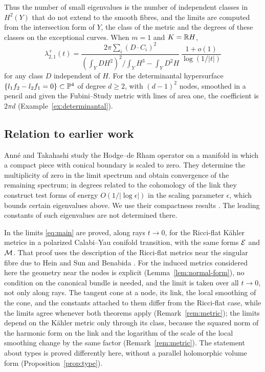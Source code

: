 Thus the number of small eigenvalues is the number of independent classes
in $H^2(Y)$ that do not extend to the smooth fibres, and the limits are
computed from the intersection form of $Y$, the class of the metric and
the degrees of these classes on the exceptional curves. When $m=1$ and
$K=\mathbb R H$,
\begin{equation}\label{eq:intro-rank-one}
 \lambda^+_{2,1}(t)=\frac{2\pi\sum_i(D\cdot C_i)^2}
 {(\int_YDH^2)^2/\int_YH^3-\int_YD^2H}\ \frac{1+o(1)}{\log(1/|t|)}
\end{equation}
for any class $D$ independent of $H$. For the determinantal hypersurface
$\{l_1f_2-l_2f_1=0\}\subset\mathbb P^4$ of degree $d\ge2$, with $(d-1)^2$
nodes, smoothed in a pencil and given the Fubini--Study metric with lines
of area one, the coefficient is $2\pi d$
(Example~\ref{ex:determinantal}).

\subsection{Relation to earlier work}
Ann\'e and Takahashi \cite{anne-takahashi} study the Hodge--de Rham
operator on a manifold in which a compact piece with conical boundary is
scaled to zero. They determine the multiplicity of zero in the limit
spectrum and obtain convergence of the remaining spectrum; in degrees
related to the cohomology of the link they construct test forms of
energy $O(1/|\log\epsilon|)$ in the scaling parameter $\epsilon$, which
bounds certain eigenvalues above. We use their compactness results
\cite[Corollary~17 and Lemma~18]{anne-takahashi}. The leading constants of such eigenvalues are not determined there.

In \cite{wuebben-conifold} the limits \eqref{eq:main} are proved, along
rays $t\to0$, for the Ricci-flat K\"ahler metrics in a polarized
Calabi--Yau conifold transition, with the same forms $\mathcal E$ and $\mathcal M$.
That proof uses the description of the Ricci-flat metrics near the
singular fibre due to Hein and Sun \cite{hein-sun} and Benabida
\cite{benabida}. For the induced metrics considered here the geometry
near the nodes is explicit (Lemma~\ref{lem:normal-form}), no condition
on the canonical bundle is needed, and the limit is taken over all
$t\to0$, not only along rays. The tangent cone at a node, its link, the local smoothing of the cone,
and the constants attached to them differ from the Ricci-flat case, while the
limits agree whenever both theorems apply
(Remark~\ref{rem:metric}); the limits depend on the K\"ahler metric only
through its class, because the squared norm of the harmonic form on the
link and the logarithm of the scale of the local smoothing change by the
same factor (Remark~\ref{rem:metric}). The statement about types is proved differently
here, without a parallel holomorphic volume form
(Proposition~\ref{prop:type}).

